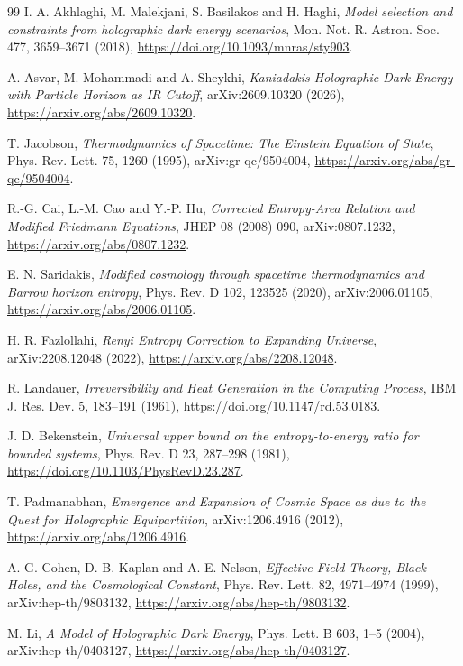 \documentclass[11pt,a4paper]{article}
\begin{document}
\begin{thebibliography}{99}
I. A. Akhlaghi, M. Malekjani, S. Basilakos and H. Haghi,
\textit{Model selection and constraints from holographic dark energy scenarios},
Mon. Not. R. Astron. Soc. 477, 3659--3671 (2018),
\url{https://doi.org/10.1093/mnras/sty903}.

A. Asvar, M. Mohammadi and A. Sheykhi,
\textit{Kaniadakis Holographic Dark Energy with Particle Horizon as IR Cutoff},
arXiv:2609.10320 (2026),
\url{https://arxiv.org/abs/2609.10320}.

T. Jacobson,
\textit{Thermodynamics of Spacetime: The Einstein Equation of State},
Phys. Rev. Lett. 75, 1260 (1995),
arXiv:gr-qc/9504004,
\url{https://arxiv.org/abs/gr-qc/9504004}.

R.-G. Cai, L.-M. Cao and Y.-P. Hu,
\textit{Corrected Entropy-Area Relation and Modified Friedmann Equations},
JHEP 08 (2008) 090,
arXiv:0807.1232,
\url{https://arxiv.org/abs/0807.1232}.

E. N. Saridakis,
\textit{Modified cosmology through spacetime thermodynamics and Barrow horizon entropy},
Phys. Rev. D 102, 123525 (2020),
arXiv:2006.01105,
\url{https://arxiv.org/abs/2006.01105}.

H. R. Fazlollahi,
\textit{Renyi Entropy Correction to Expanding Universe},
arXiv:2208.12048 (2022),
\url{https://arxiv.org/abs/2208.12048}.

R. Landauer,
\textit{Irreversibility and Heat Generation in the Computing Process},
IBM J. Res. Dev. 5, 183--191 (1961),
\url{https://doi.org/10.1147/rd.53.0183}.

J. D. Bekenstein,
\textit{Universal upper bound on the entropy-to-energy ratio for bounded systems},
Phys. Rev. D 23, 287--298 (1981),
\url{https://doi.org/10.1103/PhysRevD.23.287}.

T. Padmanabhan,
\textit{Emergence and Expansion of Cosmic Space as due to the Quest for Holographic Equipartition},
arXiv:1206.4916 (2012),
\url{https://arxiv.org/abs/1206.4916}.


A. G. Cohen, D. B. Kaplan and A. E. Nelson,
\textit{Effective Field Theory, Black Holes, and the Cosmological Constant},
Phys. Rev. Lett. 82, 4971--4974 (1999),
arXiv:hep-th/9803132,
\url{https://arxiv.org/abs/hep-th/9803132}.

M. Li,
\textit{A Model of Holographic Dark Energy},
Phys. Lett. B 603, 1--5 (2004),
arXiv:hep-th/0403127,
\url{https://arxiv.org/abs/hep-th/0403127}.


\end{thebibliography}
\end{document}
